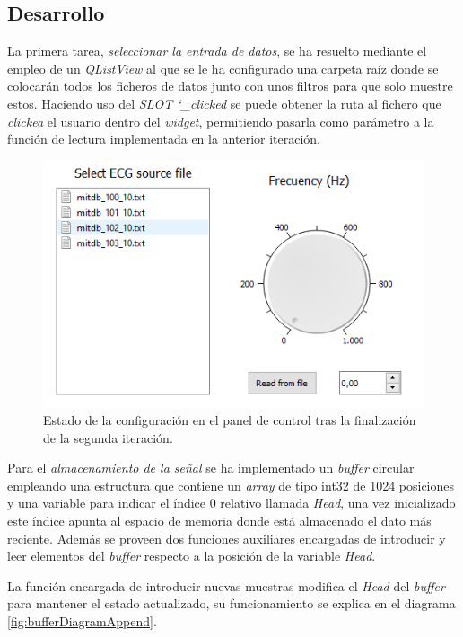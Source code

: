     \subsection{Desarrollo}
        
        La primera tarea, \textit{seleccionar la entrada de datos}, se ha resuelto mediante el empleo de un \textit{QListView} \cite{QListView} al que se le ha configurado una carpeta raíz donde se colocarán todos los ficheros de datos junto con unos filtros para que solo muestre estos. Haciendo uso del \textit{SLOT \char`_clicked} se puede obtener la ruta al fichero que \textit{clickea} el usuario dentro del \textit{widget}, permitiendo pasarla como parámetro a la función de lectura implementada en la anterior iteración. 
        
        \begin{figure}[H] 
                \centering
                        \includegraphics[width = 0.8 \linewidth]{figuras/fileView.png}
                \caption{Estado de la configuración en el panel de control tras la finalización de la segunda iteración.}
                \label{fig:fileView}
        \end{figure}
        
        Para el \textit{almacenamiento de la señal} se ha implementado un \textit{buffer} circular empleando una estructura que contiene un \textit{array} de tipo int32 de 1024 posiciones y una variable para indicar el índice 0 relativo llamada \textit{Head}, una vez inicializado este índice apunta al espacio de memoria donde está almacenado el dato más reciente. Además se proveen dos funciones auxiliares encargadas de introducir y leer elementos del \textit{buffer} respecto a la posición de la variable \textit{Head}. 
        
        La función encargada de introducir nuevas muestras modifica el \textit{Head} del \textit{buffer} para mantener el estado actualizado, su funcionamiento se explica en el diagrama \ref{fig:bufferDiagramAppend}. 
    
